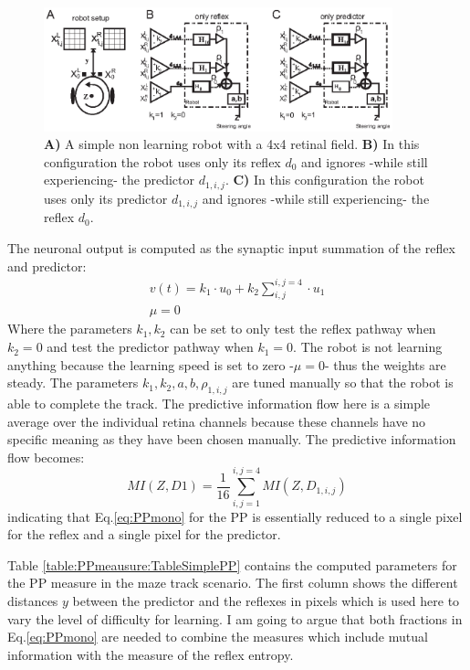 \begin{figure}[!hbt]
	\begin{center}
		\includegraphics[width=0.9\textwidth]{figures/ppmeasure/4}
	\end{center}
	\caption[Simple retinal robot]{
	{\bf A)} A simple non learning robot with a 4x4 retinal field. 
	{\bf B)} In this configuration the robot uses only its reflex $d_0$ and ignores -while still experiencing- the predictor $d_{1,i,j}$. 
	{\bf C)} In this configuration the robot uses only its predictor $d_{1,i,j}$ and ignores -while still experiencing- the reflex $d_0$. 	
	\label{PPmeasure:Figure4}} 
\end{figure}

The neuronal output is computed as the synaptic input summation of the reflex and predictor:
\begin{equation}
  \begin{array}{ll}
	v(t)=k_1\cdot u_{0}+k_2 \sum\limits_{i,j}^{i,j=4} \cdot u_{1}\\ 
        \mu=0
  \end{array}
\label{MotorSimple}
\end{equation}
Where the parameters $k_1,k_2$ can be set to only test the reflex pathway when
$k_2=0$ and test the predictor pathway when $k_1=0$.
The robot is not learning anything because the learning speed is set to
zero -$\mu=0$- thus the weights are steady. The parameters $k_1,k_2,a,b,\rho_{1,i,j}$ are 
tuned manually so that the robot is able to complete the track.
The predictive information flow here is a simple average over the individual retina channels
because these channels have no specific meaning as they have been chosen manually.
The predictive information flow becomes:
 \begin{equation}
 MI(Z,D1)=\frac{1}{16} \sum\limits_{i,j=1}^{i,j=4} MI(Z,D_{1,i,j})
 \end{equation}
indicating that Eq.\ref{eq:PPmono} for the PP is essentially reduced to a single pixel 
for the reflex and a single pixel for the predictor. 

Table \ref{table:PPmeausure:TableSimplePP} contains the computed parameters for 
the PP measure in the maze track scenario.
The first column shows the different distances $y$ between the predictor and the reflexes
in pixels which is used here to vary the level of difficulty for learning.
I am going to argue that both fractions in Eq.\ref{eq:PPmono} are needed to combine
the measures which include mutual information with the measure of the reflex entropy.


